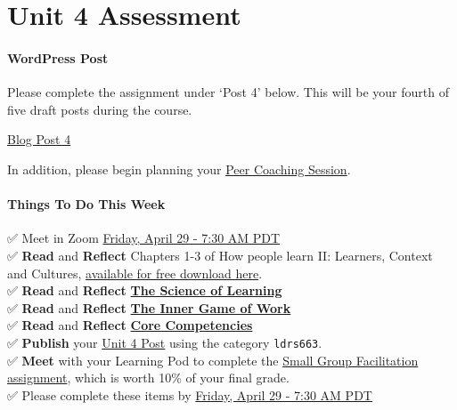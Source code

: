 \documentclass[
]{book}
\begin{document}
\hypertarget{unit-4-assessment}{%
\section*{Unit 4 Assessment}\label{unit-4-assessment}}

\begin{wp}
\hypertarget{wordpress-post}{%
\paragraph{WordPress Post}\label{wordpress-post}}

Please complete the assignment under `Post 4' below. This will be your
fourth of five draft posts during the course.

\href{https://ma-lead.github.io/ldrs663/assessments.html\#post-4}{Blog
Post 4}

In addition, please begin planning your
\href{https://ma-lead.github.io/ldrs663/assessments.html\#peer-coaching-session-15}{Peer
Coaching Session}.
\end{wp}
\begin{todo}
\hypertarget{things-to-do-this-week}{%
\paragraph{Things To Do This Week}\label{things-to-do-this-week}}

✅ Meet in Zoom
\href{https://www.timeanddate.com/worldclock/fixedtime.html?msg=LDRS+663+Meeting\&iso=20220429T0730\&p1=1109\&ah=1\&am=30}{Friday,
April 29 - 7:30 AM PDT}\\
✅ \textbf{Read} and \textbf{Reflect} Chapters 1-3 of How people learn
II: Learners, Context and Cultures,
\href{https://www.nap.edu/catalog/24783}{available for free download
here}.\\
✅ \textbf{Read} and \textbf{Reflect}
\href{https://deansforimpact.org/wp-content/uploads/2016/12/The_Science_of_Learning.pdf}{\textbf{The
Science of Learning}}\\
✅ \textbf{Read} and \textbf{Reflect}
\href{https://thesystemsthinker.com/the-inner-game-of-work-building-capability-in-the-workplace/}{\textbf{The
Inner Game of Work}}\\
✅ \textbf{Read} and \textbf{Reflect}
\href{https://coachfederation.org/core-competencies}{\textbf{Core
Competencies}}\\
✅ \textbf{Publish} your
\href{https://ma-lead.github.io/ldrs663/assessments.html\#post-4}{Unit 4
Post} using the category \texttt{ldrs663}.\\
✅ \textbf{Meet} with your Learning Pod to complete the
\href{https://ma-lead.github.io/ldrs663/assessments.html\#small-group-facilitation-10}{Small
Group Facilitation assignment}, which is worth 10\% of your final
grade.\\
✅ Please complete these items by
\href{https://www.timeanddate.com/worldclock/fixedtime.html?msg=LDRS+663+Meeting\&iso=20220429T0730\&p1=1109\&ah=1\&am=30}{Friday,
April 29 - 7:30 AM PDT}
\end{todo}
\end{document}
